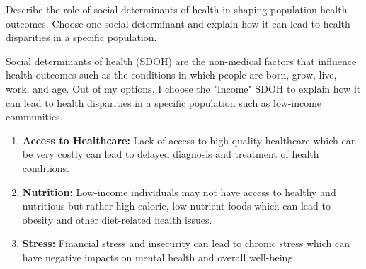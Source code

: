 \documentclass[a4paper]{exam}
\begin{document}
\begin{questions}
    \question[10]
    Describe the role of social determinants of health in shaping population health outcomes. Choose one social determinant and explain how it can lead to health disparities in a specific population.
    \begin{solution}
        Social determinants of health (SDOH) are the non-medical factors that influence health outcomes such as the conditions in which people are born, grow, live, work, and age.
        Out of my options, I choose the "Income" SDOH to explain how it can lead to health disparities in a specific population such as low-income communities.
        \begin{enumerate}
            \item \textbf{Access to Healthcare:} Lack of access to high quality healthcare which can be very costly can lead to delayed diagnosis and treatment of health conditions.
            \item \textbf{Nutrition:} Low-income individuals may not have access to healthy and nutritious but rather high-calorie, low-nutrient foods which can lead to obesity and other diet-related health issues.
            \item \textbf{Stress:} Financial stress and insecurity can lead to chronic stress which can have negative impacts on mental health and overall well-being.
        \end{enumerate}
    \end{solution}

\end{questions}
\end{document}
